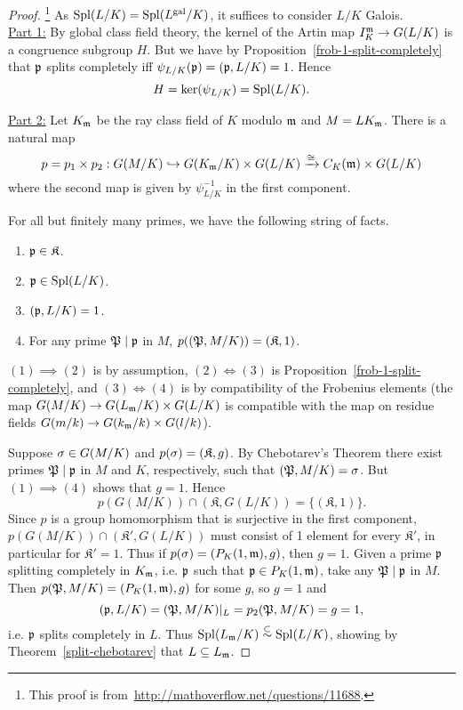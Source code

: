 \begin{proof}\footnote{This proof is from~\url{http://mathoverflow.net/questions/11688}.}
As $\operatorname{Spl}(L/K)=\operatorname{Spl}(L^{\text{gal}}/K)$, it suffices to consider $L/K$ Galois.\\

\noindent\underline{Part 1:} By global class field theory, the kernel of the Artin map $I_K^{\mathfrak{m}}\to G(L/K)$ is a congruence subgroup $H$. But we have by Proposition~\ref{frob-1-split-completely} that $\mathfrak{p}$ splits completely iff $\psi_{L/K}(\mathfrak{p})=(\mathfrak{p},L/K)=1$. Hence
\[
H=\ker(\psi_{L/K})=\operatorname{Spl}(L/K).
\]

\noindent\underline{Part 2:} Let $K_{\mathfrak{m}}$ be the ray class field of $K$ modulo $\mathfrak{m}$ and $M=LK_{\mathfrak{m}}$.
There is a natural map
\[
p=p_1\times p_2:G(M/K)\hookrightarrow G(K_{\mathfrak{m}}/K)\times G(L/K) \xrightarrow{\cong} C_{K}(\mathfrak{m})\times G(L/K)
\]
where the second map is given by $\psi_{L/K}^{-1}$ in the first component. 

For all but finitely many primes, we have the following string of facts. %
\begin{enumerate}
\item
$\mathfrak{p}\in \mathfrak K$.
\item
$\mathfrak{p}\in \operatorname{Spl}(L/K)$.
\item
$(\mathfrak{p},L/K)=1$.
\item
For any prime $\mathfrak{P}\mid \mathfrak{p}$ in $M$, 
$p((\mathfrak{P},M/K))=(\mathfrak K,1)$.
\end{enumerate}
$(1)\implies(2)$ is by assumption, $(2)\iff (3)$ is Proposition~\ref{frob-1-split-completely}, and $(3)\iff (4)$ is by compatibility of the Frobenius elements (the map $G(M/K)\to G(L_{\mathfrak{m}}/K)\times G(L/K)$ is compatible with the map on residue fields $G(m/k)\to G(k_{\mathfrak{m}}/k)\times G(l/k)$).

Suppose $\sigma\in G(M/K)$ and $p(\sigma)=(\mathfrak K, g)$. By Chebotarev's Theorem there exist primes $\mathfrak{P}\mid \mathfrak{p}$ in $M$ and $K$, respectively, such that $(\mathfrak{P},M/K)=\sigma$. But $(1)\implies (4)$ shows that $g=1$. Hence
\[
p(G(M/K))\cap (\mathfrak K,G(L/K))=\{(\mathfrak K,1)\}.
\]
Since $p$ is a group homomorphism that is surjective in the first component, $p(G(M/K))\cap (\mathfrak K',G(L/K))$ must consist of 1 element for every $\mathfrak K'$, in particular for $\mathfrak K'=1$. Thus if $p(\sigma)=(P_K(1,\mathfrak{m}),g)$, then $g=1$. Given a prime $\mathfrak{p}$ splitting completely in $K_{\mathfrak{m}}$, i.e. $\mathfrak{p}$ such that $\mathfrak{p} \in P_K(1,\mathfrak{m})$, take any $\mathfrak{P}\mid \mathfrak{p}$ in $M$. Then $p(\mathfrak{P},M/K)=(P_K(1,\mathfrak{m}),g)$ for some $g$, so $g=1$ and
\[
(\mathfrak{p},L/K)=(\mathfrak{P},M/K)|_L=p_2(\mathfrak{P},M/K)=g=1,
\]
i.e. $\mathfrak{p}$ splits completely in $L$. Thus $\operatorname{Spl}(L_{\mathfrak{m}}/K)\stackrel{\subset}{\sim}\operatorname{Spl}(L/K)$, showing by Theorem~\ref{split-chebotarev} that
$L\subseteq L_{\mathfrak{m}}$.
\end{proof}
